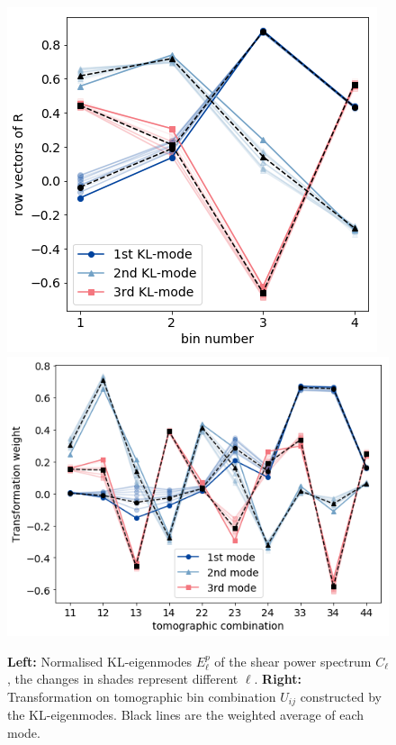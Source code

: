 \documentclass[twocolumn]{\docclass}
\begin{document}
	\begin{figure}[thbp]
		\includegraphics[width=0.80\columnwidth]{epi.png}
		\includegraphics[width=1.02\columnwidth]{Wij.png}
		\caption{\textbf{Left:} Normalised KL-eigenmodes $E_\ell^p$ of the shear power spectrum $C_{\ell}$, the changes in shades represent different $\ell$. \textbf{Right:} Transformation on tomographic bin combination $U_{ij}$ constructed by the KL-eigenmodes. Black lines are the weighted average of each mode. \label{fig:kl-mode}}
	\end{figure}
	
\end{document}
